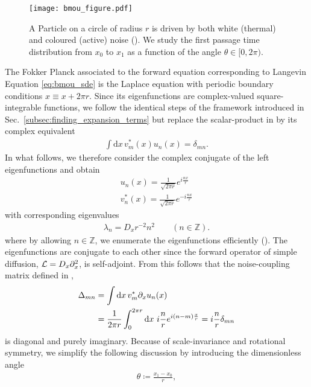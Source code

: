 \documentclass[%
 reprint,
superscriptaddress,
nofootinbib,
 amsmath,amssymb,
 aps,
prx,
]{revtex4-2}
\begin{document}
\begin{figure}[t]
\texttt{[image: bmou\_figure.pdf]}
\caption{A Particle on a circle of radius $r$ is driven by both white (thermal) and coloured (active) noise (\cf {}). We study the first passage time distribution from $x_0$ to $x_1$ as a function of the angle $\theta \in [0,2 \pi)$.}
\label{fig:atbm_ring}
\end{figure}

The Fokker Planck associated to the forward equation corresponding to Langevin Equation \eqref{eq:bmou_sde} is the Laplace equation with periodic boundary conditions $x \equiv x+ 2 \pi r$. Since its eigenfunctions are complex-valued square-integrable functions, we follow the identical steps of the framework introduced in Sec.~\ref{subsec:finding_expansion_terms} but replace the scalar-product in  by its complex equivalent 
\begin{align}
\int \mathrm{d}{x}\, v_m^{*}(x) u_n(x) = \delta_{mn}.
\end{align} 
In what follows, we therefore consider the complex conjugate of the left eigenfunctions and obtain
	\begin{align}
		u_n(x) = \frac{1}{\sqrt{2\pi r}} e^{i \frac{n x}{r}} \\
		v_n^*(x) = \frac{1}{\sqrt{2\pi r}} e^{-i \frac{nx}{r}}
	\end{align}
	with corresponding eigenvalues
	\begin{align}
		\lambda_n = D_xr^{-2} n^2 \qquad (n \in \mathbb{Z}).
		\label{}
	\end{align}
	where by allowing $n \in \mathbb{Z}$, we enumerate the eigenfunctions efficiently (\cf {}).
The eigenfunctions are conjugate to each other since the forward operator of simple diffusion, $\mathcal{L} = D_x \partial_x^2$, is self-adjoint. From this follows that the noise-coupling matrix defined in ,
\begin{align}
	\Delta_{mn} &= \int \mathrm{d} x \, v^*_{m} \partial_x u_n(x) \nonumber \\
	&=  \frac{1}{2\pi r}\int_{0}^{2\pi r} \mathrm{d}{x}\,  \, i\frac{n}{r} e^{i(n-m)\frac{x}{r}} = i\frac{n}{r}\delta_{mn}
	\label{}
\end{align} 
is diagonal and purely imaginary. Because of scale-invariance and rotational symmetry, we simplify the following discussion by introducing the dimensionless angle
\begin{align}
    \theta \coloneqq \frac{x_1-x_0}{r},
\end{align}
\end{document}
